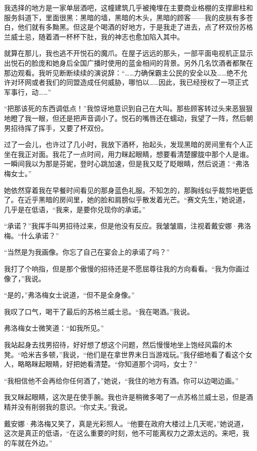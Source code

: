 \documentclass[AutoFakeBold=true]{book}
\begin{document}
我选择的地方是一家单层酒吧，这幢建筑几乎被掩埋在主要商业格棚的支撑廊柱和服务斜道下，里面很黑：黑暗的墙，黑暗的木头，黑暗的顾客——我的皮肤有多苍白，他们就有多黝黑。但这是个喝酒的好地方，于是我走了进去，点了杯双份苏格兰威士忌，随着酒一杯杯下肚，我的神志也愈加陷入其中。

就算在那儿，我也逃不开悦石的魔爪。在屋子远远的那头，一部平面电视机正显示出悦石的脸庞和她身后全国广播时使用的蓝金相间的背景。另外几名饮酒者都聚在那边观看。我听见断断续续的演说辞：``……力确保霸主公民的安全以及……绝不允许对环网或者我们的同盟造成任何威胁，哪怕以……因此，我已经授权了一项正式军事行，动……''

``把那该死的东西调低点！''我惊讶地意识到自己在大叫。那些顾客转过头来恶狠狠地瞪了我一眼，但还是把声音调小了。悦石的嘴唇还在蠕动，我望了一阵，然后朝男招待挥了挥手，又要了杯双份。

过了一会儿，也许过了几小时，我放下酒杯，抬起头，发现黑暗的房间里有个人正坐在我正对面。我花了一点时间，用力眯起眼睛，想要看清楚朦胧中那个人是谁。一瞬间我以为那是芬妮，登时心跳加速，但是我又眨了眨眼睛，然后说道：``弗洛梅女士。''

她依然穿着我在早餐时间看见的那身蓝色礼服。不知怎的，那胸线似乎裁剪地更低了。在近乎黑暗的房间里，她的脸和肩膀似乎散发着光芒。``赛文先生，''她说道，几乎是在低语，``我来，是要你兑现你的承诺。''

``承诺？''我挥手叫男招待过来，但是他没有反应。我皱皱眉，注视着戴安娜·弗洛梅。``什么承诺？''

``当然是为我画像。你忘了自己在宴会上的承诺了吗？''

我打了个响指，但是那个傲慢的招待还是不愿屈尊往我的方向看看。``我为你画过像了，''我说。

``是的，''弗洛梅女士说道，``但不是{\kaishu 全身}像。''

我叹了口气，喝干了最后的苏格兰威士忌。``我在喝酒。''我说。

弗洛梅女士微笑道：``如我所见。''

我站起身去找男招待，好好想了想这个问题，然后慢慢地坐上饱经风霜的木凳。``哈米吉多顿，''我说，``他们是在拿世界末日当游戏玩。''我仔细地看了看这个女人，略略眯起眼睛，好把她看清楚。``你知道那个词吗，女士？''

``我相信他不会再给你任何酒了，''她说，``我住的地方有酒。你可以边喝边画。''

我又眯起眼睛，这次是在使手腕。我也许是稍微多喝了一点苏格兰威士忌，但是酒精并没有削弱我的意识。``你丈夫。''我说。

戴安娜·弗洛梅又笑了，真是光彩照人。``他要在政府大楼过上几天呢，''她说道，这次是真正的低语，``在这么重要的时刻，他不可能离权力之源太远的。来吧，我的车就在外边。''
\end{document}
